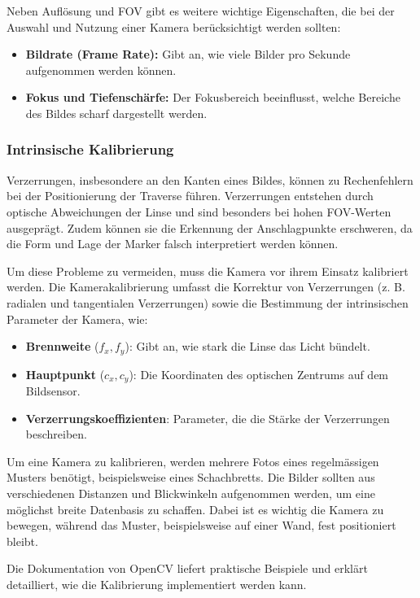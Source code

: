 Neben Auflösung und FOV gibt es weitere wichtige Eigenschaften, die 
bei der Auswahl und Nutzung einer Kamera berücksichtigt werden sollten:

\begin{itemize}
    \item \textbf{Bildrate (Frame Rate):} Gibt an, wie viele Bilder pro Sekunde aufgenommen werden können.
    \item \textbf{Fokus und Tiefenschärfe:} Der Fokusbereich beeinflusst, welche Bereiche des Bildes scharf dargestellt werden.
\end{itemize}


\subsubsection{Intrinsische Kalibrierung}
Verzerrungen, insbesondere an den Kanten eines Bildes, können zu Rechenfehlern 
bei der Positionierung der Traverse führen. Verzerrungen entstehen durch optische 
Abweichungen der Linse und sind besonders bei hohen FOV-Werten ausgeprägt. 
Zudem können sie die Erkennung der Anschlagpunkte erschweren, da die Form und 
Lage der Marker falsch interpretiert werden können.

Um diese Probleme zu vermeiden, muss die Kamera vor ihrem Einsatz kalibriert
werden. Die Kamerakalibrierung umfasst die Korrektur von Verzerrungen 
(z. B. radialen und tangentialen Verzerrungen) sowie die Bestimmung der 
intrinsischen Parameter der Kamera, wie:

\begin{itemize}
    \item \textbf{Brennweite} (\( f_x, f_y \)): Gibt an, wie stark die Linse das Licht bündelt.
    \item \textbf{Hauptpunkt} (\( c_x, c_y \)): Die Koordinaten des optischen Zentrums auf dem Bildsensor.
    \item \textbf{Verzerrungskoeffizienten}: Parameter, die die Stärke der Verzerrungen beschreiben.
\end{itemize}

Um eine Kamera zu kalibrieren, werden mehrere Fotos eines regelmässigen Musters 
benötigt, beispielsweise eines Schachbretts. Die Bilder sollten aus verschiedenen 
Distanzen und Blickwinkeln aufgenommen werden, um eine möglichst breite Datenbasis 
zu schaffen. Dabei ist es wichtig die Kamera zu bewegen, während das Muster, 
beispielsweise auf einer Wand, fest positioniert bleibt.

Die Dokumentation von OpenCV \cite{opencv_calibration_tutorial} liefert praktische 
Beispiele und erklärt detailliert, wie die Kalibrierung implementiert werden 
kann.


